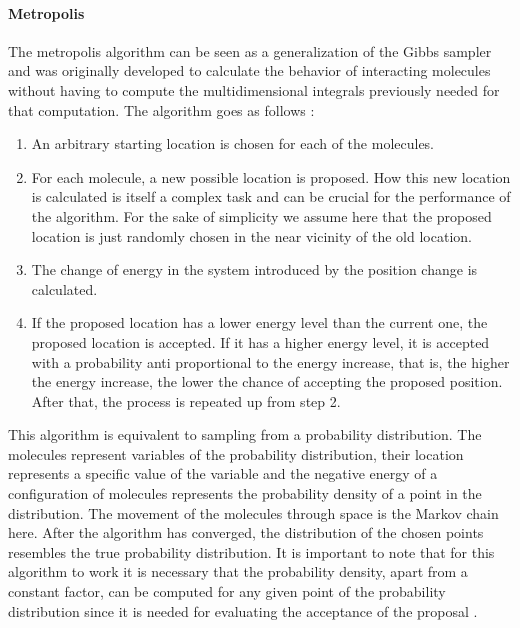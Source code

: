 \documentclass{article}
\begin{document}
\paragraph{Metropolis}
The metropolis algorithm can be seen as a generalization of the Gibbs sampler \cite{1439840954} and was originally developed to calculate the behavior of interacting molecules without having to compute the multidimensional integrals previously needed for that computation\cite{Metropolis1953}. The algorithm goes as follows : 
\begin{enumerate}
	\item An arbitrary starting location is chosen for each of the molecules. 
	\item For each molecule, a new possible location is proposed. How this new location is calculated is itself a complex task and can be crucial for the performance of the algorithm. For the sake of simplicity we assume here that the proposed location is just randomly chosen in the near vicinity of the old location.
	\item The change of energy in the system introduced by the position change is calculated.
	\item If the proposed location has a lower energy level than the current one, the proposed location is accepted. If it has a higher energy level, it is accepted with
	a probability anti proportional to the energy increase, that is, the higher the energy increase, the lower the chance of accepting the proposed position. After that, the process is repeated up from step 2.
\end{enumerate}
This algorithm is equivalent to sampling from a probability distribution. The molecules represent variables of the probability distribution, their location represents a specific value of the variable and the negative energy of a configuration of molecules represents the probability density of a point in the distribution. The movement of the molecules through space is the Markov chain here. After the algorithm has converged, the distribution of the chosen points resembles the true probability distribution. It is important to note that for this algorithm to work it is necessary that the probability density, apart from a constant factor, can be computed for any given point of the probability distribution since it is needed for evaluating the acceptance of the proposal \cite{1439840954}.

\end{document}

